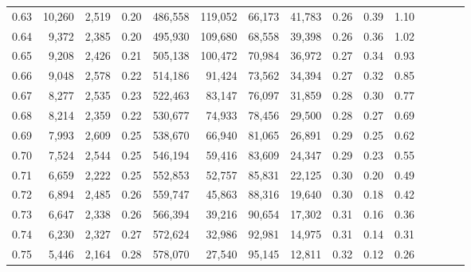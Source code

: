 \begin{tabular}{rrrcrrrrrrrrrrr}
0.63 &  10,260 &  2,519 &                                       0.20 &  486,558 &  119,052 &   66,173 &   41,783 &  0.26 &  0.39 &                         1.10 \\
0.64 &   9,372 &  2,385 &                                       0.20 &  495,930 &  109,680 &   68,558 &   39,398 &  0.26 &  0.36 &                         1.02 \\
0.65 &   9,208 &  2,426 &                                       0.21 &  505,138 &  100,472 &   70,984 &   36,972 &  0.27 &  0.34 &                         0.93 \\
0.66 &   9,048 &  2,578 &                                       0.22 &  514,186 &   91,424 &   73,562 &   34,394 &  0.27 &  0.32 &                         0.85 \\
0.67 &   8,277 &  2,535 &                                       0.23 &  522,463 &   83,147 &   76,097 &   31,859 &  0.28 &  0.30 &                         0.77 \\
0.68 &   8,214 &  2,359 &                                       0.22 &  530,677 &   74,933 &   78,456 &   29,500 &  0.28 &  0.27 &                         0.69 \\
0.69 &   7,993 &  2,609 &                                       0.25 &  538,670 &   66,940 &   81,065 &   26,891 &  0.29 &  0.25 &                         0.62 \\
0.70 &   7,524 &  2,544 &                                       0.25 &  546,194 &   59,416 &   83,609 &   24,347 &  0.29 &  0.23 &                         0.55 \\
0.71 &   6,659 &  2,222 &                                       0.25 &  552,853 &   52,757 &   85,831 &   22,125 &  0.30 &  0.20 &                         0.49 \\
0.72 &   6,894 &  2,485 &                                       0.26 &  559,747 &   45,863 &   88,316 &   19,640 &  0.30 &  0.18 &                         0.42 \\
0.73 &   6,647 &  2,338 &                                       0.26 &  566,394 &   39,216 &   90,654 &   17,302 &  0.31 &  0.16 &                         0.36 \\
0.74 &   6,230 &  2,327 &                                       0.27 &  572,624 &   32,986 &   92,981 &   14,975 &  0.31 &  0.14 &                         0.31 \\
0.75 &   5,446 &  2,164 &                                       0.28 &  578,070 &   27,540 &   95,145 &   12,811 &  0.32 &  0.12 &                         0.26 \\

\end{tabular}
